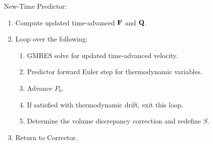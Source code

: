 \documentclass[final]{siamltex}
\def\Fb {{\bf F}}
\def\Qb {{\bf Q}}
\begin{document}
New-Time Predictor:\\
\begin{enumerate}
\item Compute updated time-advanced $\Fb$ and $\Qb$.
\item Loop over the following:
\begin{enumerate}
\item GMRES solve for updated time-advanced velocity.
\item Predictor forward Euler step for thermodynamic variables.
\item Advance $P_0$.
\item If satisfied with thermodynamic drift, exit this loop.
\item Determine the volume discrepancy correction and redefine $S$.
\end{enumerate}
\item Return to Corrector.
\end{enumerate}
\end{document}
